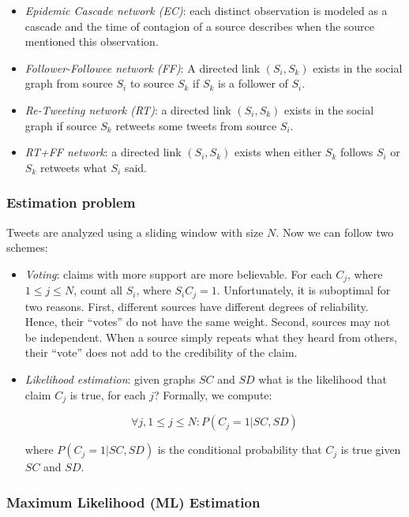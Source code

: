 \documentclass[a4paper,12pt]{article}
\begin{document}
\begin{itemize}
	\item \textit{Epidemic Cascade network (EC)}: each distinct observation is modeled as a cascade and the time of contagion of a source describes when the source mentioned this observation.
	\item \textit{Follower-Followee network (FF)}: A directed link $(S_i, S_k)$ exists in the social graph from source $S_i$ to source $S_k$ if $S_k$ is a follower of $S_i$.
	\item \textit{Re-Tweeting network (RT)}: a directed link $(S_i, S_k)$ exists in the social graph if source $S_k$ retweets some tweets from source $S_i$.
	\item \textit{RT+FF network}: a directed link $(S_i, S_k)$ exists when either $S_k$ follows $S_i$ or $S_k$ retweets what $S_i$ said.
\end{itemize}

\subsubsection{Estimation problem}

Tweets are analyzed using a sliding window with size $N$. Now we can follow two schemes:

\begin{itemize}
	\item \textit{Voting}: claims with more support are more believable. For each $C_j$, where $1 \le j \le N$, count all $S_i$, where $S_iC_j = 1$. Unfortunately, it is suboptimal for two reasons. First, different sources have different degrees of reliability. Hence, their “votes” do not have the same weight. Second, sources may not be independent. When a source simply repeats what they heard from others, their “vote” does not add to the credibility of the claim.
	
	\item \textit{Likelihood estimation}: given graphs $SC$ and $SD$ what is the likelihood that claim $C_j$ is true, for each $j$? Formally, we compute:

	$$ \forall j, 1 \le j \le N : P(C_j = 1 | SC, SD) $$

	where $P(C_j = 1|SC, SD)$ is the conditional probability that $C_j$ is true given $SC$ and $SD$.
\end{itemize}

\subsubsection{Maximum Likelihood (ML) Estimation}
\end{document}

